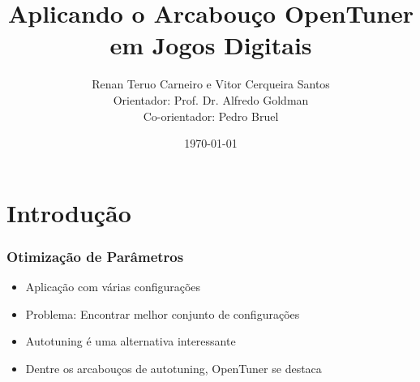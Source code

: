 \documentclass[10pt]{beamer}
\title{Aplicando o Arcabouço OpenTuner em Jogos Digitais}
\date{\today}
\author{Renan Teruo Carneiro e Vitor Cerqueira Santos\\
	Orientador: Prof. Dr. Alfredo Goldman\\
    Co-orientador: Pedro Bruel}
\institute{Instituto de Matemática e Estatística}
\begin{document}
\maketitle


\section{Introdução}

\begin{frame}[fragile]
	\frametitle{Otimização de Parâmetros}
	  \begin{itemize}[<+- | alert@+>]
	  	\item Aplicação com várias configurações
	  	\item Problema: Encontrar melhor conjunto de configurações
	  	\item Autotuning é uma alternativa interessante
	  	\item Dentre os arcabouços de autotuning, OpenTuner se destaca
	  \end{itemize}
\end{frame}
\end{document}
